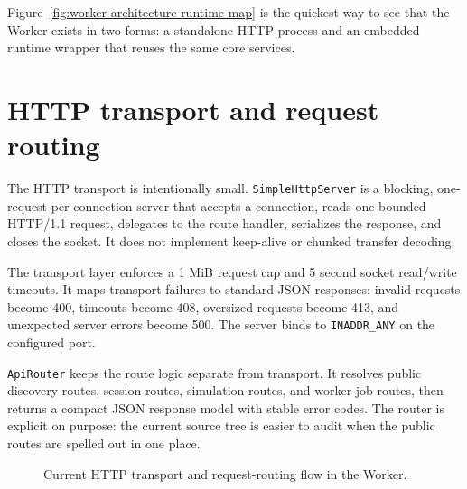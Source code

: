 Figure~\ref{fig:worker-architecture-runtime-map} is the quickest way to see that the Worker exists in two forms: a standalone HTTP process and an embedded runtime wrapper that reuses the same core services.

\section{HTTP transport and request routing}
\label{sec:worker-architecture-transport}

The HTTP transport is intentionally small. \texttt{SimpleHttpServer} is a blocking, one-request-per-connection server that accepts a connection, reads one bounded HTTP/1.1 request, delegates to the route handler, serializes the response, and closes the socket. It does not implement keep-alive or chunked transfer decoding.

The transport layer enforces a 1 MiB request cap and 5 second socket read/write timeouts. It maps transport failures to standard JSON responses: invalid requests become 400, timeouts become 408, oversized requests become 413, and unexpected server errors become 500. The server binds to \texttt{INADDR\_ANY} on the configured port.

\texttt{ApiRouter} keeps the route logic separate from transport. It resolves public discovery routes, session routes, simulation routes, and worker-job routes, then returns a compact JSON response model with stable error codes. The router is explicit on purpose: the current source tree is easier to audit when the public routes are spelled out in one place.

\begin{figure}[htbp]
\centering
\caption{Current HTTP transport and request-routing flow in the Worker.}
\label{fig:worker-architecture-request-flow}
\end{figure}

